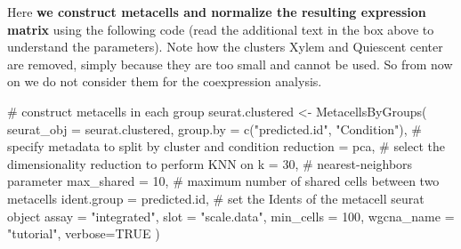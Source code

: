 \documentclass[
  letterpaper,
  DIV=11,
  numbers=noendperiod]{scrartcl}
\newenvironment{Shaded}{\begin{snugshade}}{\end{snugshade}}
\newcommand{\AttributeTok}[1]{\textcolor[rgb]{0.40,0.45,0.13}{#1}}
\newcommand{\CommentTok}[1]{\textcolor[rgb]{0.37,0.37,0.37}{#1}}
\newcommand{\ConstantTok}[1]{\textcolor[rgb]{0.56,0.35,0.01}{#1}}
\newcommand{\DecValTok}[1]{\textcolor[rgb]{0.68,0.00,0.00}{#1}}
\newcommand{\FunctionTok}[1]{\textcolor[rgb]{0.28,0.35,0.67}{#1}}
\newcommand{\NormalTok}[1]{\textcolor[rgb]{0.00,0.23,0.31}{#1}}
\newcommand{\OtherTok}[1]{\textcolor[rgb]{0.00,0.23,0.31}{#1}}
\newcommand{\StringTok}[1]{\textcolor[rgb]{0.13,0.47,0.30}{#1}}
\begin{document}
Here \textbf{we construct metacells and normalize the resulting
expression matrix} using the following code (read the additional text in
the box above to understand the parameters). Note how the clusters Xylem
and Quiescent center are removed, simply because they are too small and
cannot be used. So from now on we do not consider them for the
coexpression analysis.

\begin{Shaded}
\begin{Highlighting}[]
\CommentTok{\# construct metacells  in each group}
\NormalTok{seurat.clustered }\OtherTok{\textless{}{-}} \FunctionTok{MetacellsByGroups}\NormalTok{(}
  \AttributeTok{seurat\_obj =}\NormalTok{ seurat.clustered,}
  \AttributeTok{group.by =} \FunctionTok{c}\NormalTok{(}\StringTok{"predicted.id"}\NormalTok{, }\StringTok{"Condition"}\NormalTok{), }\CommentTok{\# specify metadata to split by cluster and condition}
  \AttributeTok{reduction =} \StringTok{\textquotesingle{}pca\textquotesingle{}}\NormalTok{, }\CommentTok{\# select the dimensionality reduction to perform KNN on}
  \AttributeTok{k =} \DecValTok{30}\NormalTok{, }\CommentTok{\# nearest{-}neighbors parameter}
  \AttributeTok{max\_shared =} \DecValTok{10}\NormalTok{, }\CommentTok{\# maximum number of shared cells between two metacells}
  \AttributeTok{ident.group =} \StringTok{\textquotesingle{}predicted.id\textquotesingle{}}\NormalTok{, }\CommentTok{\# set the Idents of the metacell seurat object}
  \AttributeTok{assay =} \StringTok{"integrated"}\NormalTok{,}
  \AttributeTok{slot =} \StringTok{"scale.data"}\NormalTok{,}
  \AttributeTok{min\_cells =} \DecValTok{100}\NormalTok{,}
  \AttributeTok{wgcna\_name =} \StringTok{"tutorial"}\NormalTok{,}
  \AttributeTok{verbose=}\ConstantTok{TRUE}
\NormalTok{)}
\end{Highlighting}
\end{Shaded}
\end{document}
